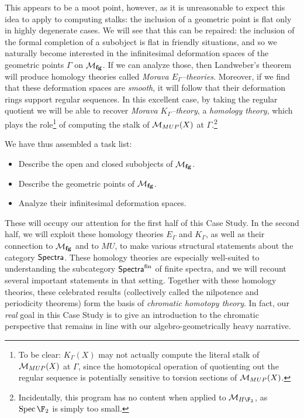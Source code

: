 This appears to be a moot point, however, as it is unreasonable to expect this idea to apply to computing stalks: the inclusion of a geometric point is flat only in highly degenerate cases.  We will see that this can be repaired: the inclusion of the formal completion of a subobject is flat in friendly situations, and so we naturally become interested in the infinitesimal deformation spaces of the geometric points $\Gamma$ on $\mathcal{M}_{\mathbf{fg}}$.  If we can analyze those, then Landweber's theorem will produce homology theories called \textit{Morava $E_\Gamma$--theories}.  Moreover, if we find that these deformation spaces are \emph{smooth}, it will follow that their deformation rings support regular sequences.  In this excellent case, by taking the regular quotient we will be able to recover \textit{Morava $K_\Gamma$--theory}, a \emph{homology theory}, which plays the role\footnote{To be clear: $K_\Gamma(X)$ may not actually compute the literal stalk of $\mathcal{M}_{MUP}(X)$ at $\Gamma$, since the homotopical operation of quotienting out the regular sequence is potentially sensitive to torsion sections of $\mathcal{M}_{MUP}(X)$.} of computing the stalk of $\mathcal{M}_{MUP}(X)$ at $\Gamma$.\footnote{Incidentally, this program has no content when applied to $\context{H\F_2}$, as $\Spec \F_2$ is simply too small.}

We have thus assembled a task list:
\begin{itemize}
\item Describe the open and closed subobjects of $\mathcal{M}_{\mathbf{fg}}$.
\item Describe the geometric points of $\mathcal{M}_{\mathbf{fg}}$.
\item Analyze their infinitesimal deformation spaces.
\end{itemize}
These will occupy our attention for the first half of this Case Study.  In the second half, we will exploit these homology theories $E_\Gamma$ and $K_\Gamma$, as well as their connection to $\mathcal{M}_{\mathbf{fg}}$ and to $MU$, to make various structural statements about the category $\mathsf{Spectra}$.  These homology theories are especially well-suited to understanding the subcategory $\mathsf{Spectra}^{\mathrm{fin}}$ of finite spectra, and we will recount several important statements in that setting.  Together with these homology theories, these celebrated results (collectively called the nilpotence and periodicity theorems) form the basis of \textit{chromatic homotopy theory}.  In fact, our \emph{real} goal in this Case Study is to give an introduction to the chromatic perspective that remains in line with our algebro-geometrically heavy narrative.









